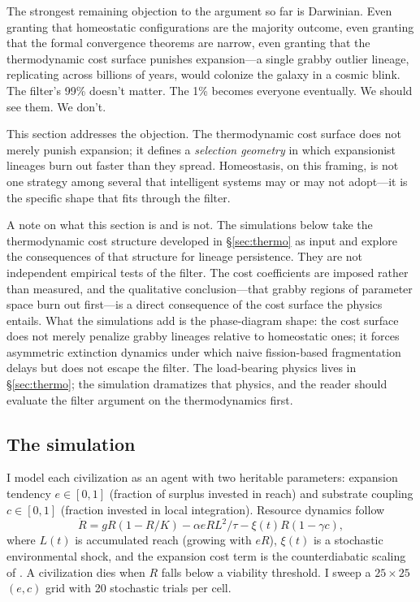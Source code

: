 \documentclass[11pt,a4paper,twocolumn]{article}
\begin{document}
The strongest remaining objection to the argument so far is Darwinian.
Even granting that homeostatic configurations are the majority outcome,
even granting that the formal convergence theorems are narrow, even
granting that the thermodynamic cost surface punishes expansion---a
single grabby outlier lineage, replicating across billions of years,
would colonize the galaxy in a cosmic blink. The filter's 99\% doesn't
matter. The 1\% becomes everyone eventually. We should see them. We
don't.

This section addresses the objection. The thermodynamic cost surface
does not merely punish expansion; it defines a \emph{selection
geometry} in which expansionist lineages burn out faster than they
spread. Homeostasis, on this framing, is not one strategy among several
that intelligent systems may or may not adopt---it is the specific
shape that fits through the filter.

A note on what this section is and is not. The simulations below take
the thermodynamic cost structure developed in \S\ref{sec:thermo} as
input and explore the consequences of that structure for lineage
persistence. They are not independent empirical tests of the filter.
The cost coefficients are imposed rather than measured, and the
qualitative conclusion---that grabby regions of parameter space burn
out first---is a direct consequence of the cost surface the physics
entails. What the simulations add is the phase-diagram shape: the
cost surface does not merely penalize grabby lineages relative to
homeostatic ones; it forces asymmetric extinction dynamics under
which naive fission-based fragmentation delays but does not escape
the filter. The load-bearing physics lives in \S\ref{sec:thermo}; the
simulation dramatizes that physics, and the reader should evaluate
the filter argument on the thermodynamics first.

\subsection{The simulation}
\label{sec:filter-sim}

I model each civilization as an agent with two heritable parameters:
expansion tendency $e \in [0,1]$ (fraction of surplus invested in
reach) and substrate coupling $c \in [0,1]$ (fraction invested in
local integration). Resource dynamics follow
\begin{equation}
\dot R = g R (1 - R/K) - \alpha e R L^2 / \tau - \xi(t) R (1 - \gamma c),
\end{equation}
where $L(t)$ is accumulated reach (growing with $e R$), $\xi(t)$ is
a stochastic environmental shock, and the expansion cost term is the
counterdiabatic scaling of \citet{boyd2022}. A civilization dies when
$R$ falls below a viability threshold. I sweep a $25\times25$
$(e, c)$ grid with 20 stochastic trials per cell.
\end{document}
